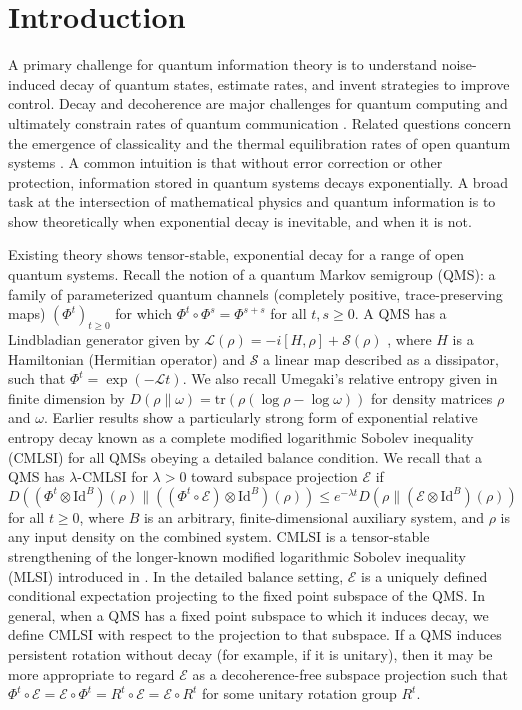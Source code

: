 \documentclass[accepted=2026-02-01, letterpaper]{quantumarticle}
\newcommand{\E}{\mathcal{E}}
\renewcommand{\S}{\mathcal{S}}
\renewcommand{\L}{\mathcal{L}}
\newcommand{\Id}{\mathrm{Id}}
\newcommand{\Ha}{H}
\newcommand{\tr}{\text{tr}}
\begin{document}
\section{Introduction}%
 A primary challenge for quantum information theory is to understand noise-induced decay of quantum states, estimate rates, and invent strategies to improve control. Decay and decoherence are major challenges for quantum computing \cite{clerk_introduction_2010, preskill_quantum_2018} and ultimately constrain rates of quantum communication \cite{wilde_quantum_2017}. Related questions concern the emergence of classicality \cite{rebolledo_decoherence_2005} and the thermal equilibration rates of open quantum systems \cite{bardet_rapid_2023, bluhm_exponential_2022}. A common intuition is that without error correction or other protection, information stored in quantum systems decays exponentially. A broad task at the intersection of mathematical physics and quantum information is to show theoretically when exponential decay is inevitable, and when it is not.

Existing theory shows tensor-stable, exponential decay for a range of open quantum systems. Recall the notion of a quantum Markov semigroup (QMS): a family of parameterized quantum channels (completely positive, trace-preserving maps) $(\Phi^t)_{t \geq 0}$ for which $\Phi^t \circ \Phi^s = \Phi^{s + s}$ for all $t,s \geq 0$. A QMS has a Lindbladian generator given by $\L(\rho) = - i [\Ha, \rho] + \S(\rho)$ \cite{lindblad_generators_1976, gorini_completely_1976}, where $\Ha$ is a Hamiltonian (Hermitian operator) and $\S$ a linear map described as a dissipator, such that $\Phi^t = \exp( - \L t)$. We also recall Umegaki's relative entropy given in finite dimension by $D(\rho \| \omega) = \tr(\rho(\log \rho - \log \omega))$ \cite{umegaki_conditional_1962} for density matrices $\rho$ and $\omega$.  Earlier results \cite{gao_complete_2022, gao_geometric_2021, junge_stability_2022} show a particularly strong form of exponential relative entropy decay known as a complete modified logarithmic Sobolev inequality (CMLSI) for all QMSs obeying a detailed balance condition. We recall \cite{gao_fisher_2020} that a QMS has $\lambda$-CMLSI for $\lambda > 0$ toward subspace projection $\E$ if
\[ D((\Phi^t \otimes \Id^B)(\rho) \| ((\Phi^t \circ \E) \otimes \Id^B)(\rho)) \leq e^{-\lambda t} D(\rho \| (\E \otimes \Id^B)(\rho))  \]
for all $t \geq 0$, where $B$ is an arbitrary, finite-dimensional auxiliary system, and $\rho$ is any input density on the combined system. CMLSI is a tensor-stable strengthening of the longer-known modified logarithmic Sobolev inequality (MLSI) introduced in \cite{kastoryano_quantum_2013}. In the detailed balance setting, $\E$ is a uniquely defined conditional expectation projecting to the fixed point subspace of the QMS. In general, when a QMS has a fixed point subspace to which it induces decay, we define CMLSI with respect to the projection to that subspace. If a QMS induces persistent rotation without decay (for example, if it is unitary), then it may be more appropriate to regard $\E$ as a decoherence-free subspace projection such that $\Phi^t \circ \E = \E \circ \Phi^t =  R^t \circ \E = \E \circ R^t$ for some unitary rotation group $R^t$.
\end{document}
